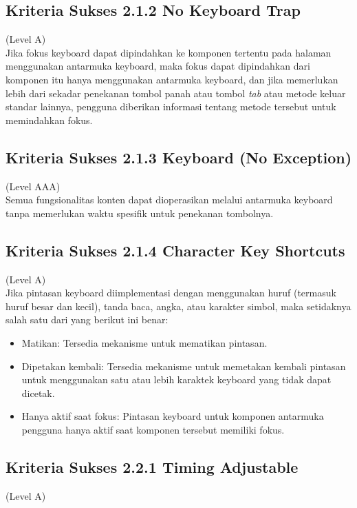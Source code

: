 \subsection{Kriteria Sukses 2.1.2 No Keyboard Trap}
\label{subsec:kriteria_2.1.2}
(Level A) \\

Jika fokus keyboard dapat dipindahkan ke komponen tertentu pada halaman menggunakan antarmuka keyboard, maka fokus dapat dipindahkan dari komponen itu hanya menggunakan antarmuka keyboard, dan jika memerlukan lebih dari sekadar penekanan tombol panah atau tombol \textit{tab} atau metode keluar standar lainnya, pengguna diberikan informasi tentang metode tersebut untuk memindahkan fokus.

\subsection{Kriteria Sukses 2.1.3 Keyboard (No Exception)}
\label{subsec:kriteria_2.1.3}
(Level AAA) \\

Semua fungsionalitas konten dapat dioperasikan melalui antarmuka keyboard tanpa memerlukan waktu spesifik untuk penekanan tombolnya.

\subsection{Kriteria Sukses 2.1.4 Character Key Shortcuts}
\label{subsec:kriteria_2.1.4}
(Level A) \\

Jika pintasan keyboard diimplementasi dengan menggunakan huruf (termasuk huruf besar dan kecil), tanda baca, angka, atau karakter simbol, maka setidaknya salah satu dari yang berikut ini benar:

\begin{itemize}
	\item Matikan: Tersedia mekanisme untuk mematikan pintasan.
	\item Dipetakan kembali: Tersedia mekanisme untuk memetakan kembali pintasan untuk menggunakan satu atau lebih karaktek keyboard yang tidak dapat dicetak.
	\item Hanya aktif saat fokus: Pintasan keyboard untuk komponen antarmuka pengguna hanya aktif saat komponen tersebut memiliki fokus.
\end{itemize}

\subsection{Kriteria Sukses 2.2.1 Timing Adjustable}
\label{subsec:kriteria_2.2.1}
(Level A) \\

